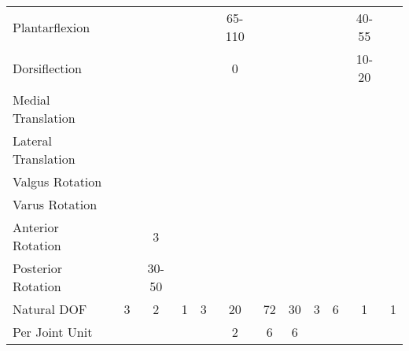 \begin{sidewaystable}
{\begin{tabular}{l c c c c c c c c c c c}
			Plantarflexion                       & \textendash & \textendash     & \textendash & \textendash      & 65-110\textdegree               & \textendash           & \textendash           & \textendash & \textendash           & 40-55\textdegree      & \textendash      \\
			Dorsiflection                        & \textendash & \textendash     & \textendash & \textendash      & 0\textdegree                    & \textendash           & \textendash           & \textendash & \textendash           & 10-20\textdegree      & \textendash      \\
			Medial Translation                   & \textendash & \textendash     & \textendash & \textendash      & \textendash           & \textasteriskcentered & \textasteriskcentered & \textendash & \textasteriskcentered & \textendash & \textendash      \\
			Lateral Translation                  & \textendash & \textendash     & \textendash & \textendash      & \textendash           & \textasteriskcentered & \textasteriskcentered & \textendash & \textasteriskcentered & \textendash & \textendash      \\
			Valgus Rotation                      & \textendash & \textendash     & \textendash & \textendash      & \textendash           & \textendash           & \textendash           & \textendash & \textendash           & \textendash & \textendash      \\
			Varus Rotation                       & \textendash & \textendash     & \textendash & \textendash      & \textendash           & \textendash           & \textendash           & \textendash & \textendash           & \textendash & \textendash      \\
			Anterior Rotation                    & \textendash & 3\textdegree              & \textendash & \textendash      & \textendash           & \textendash           & \textendash           & \textendash & \textendash           & \textendash & \textendash      \\
			Posterior Rotation                   & \textendash & 30-50\textdegree          & \textendash & \textendash      & \textendash           & \textendash           & \textendash           & \textendash & \textendash           & \textendash & \textendash      \\
			Natural DOF                          & 3           & 2               & 1           & 3                & 20                    & 72                    & 30                    & 3           & 6                     & 1           & 1                \\
			Per Joint Unit                       &             &                 &             &                  & 2                     & 6                     & 6                     &             &                       &             &                  \\ \bottomrule
		\end{tabular}}
\end{sidewaystable}


